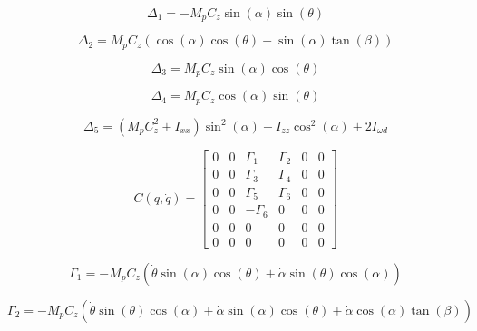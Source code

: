 \documentclass[11pt, twoside]{book}     %
\begin{document}
            \begin{equation}
                \Delta_1 = -M_p C_z\sin(\alpha)\sin(\theta)
            \end{equation}

            \begin{equation}
                \Delta_2 = M_p C_z(\cos(\alpha)\cos(\theta)-\sin(\alpha)\tan(\beta))
            \end{equation}

            \begin{equation}
                \Delta_3 = M_p C_z\sin(\alpha)\cos(\theta)
            \end{equation}

            \begin{equation}
                \Delta_4 = M_p C_z\cos(\alpha)\sin(\theta)
            \end{equation}

            \begin{equation}
                \Delta_5 = (M_pC_z^{2}+I_{xx})\sin^{2}(\alpha)+I_{zz}\cos^{2}(\alpha)+2I_{\omega d}
            \end{equation}

            \begin{equation}
            C(q, \dot{q}) =
            \begin{bmatrix}
                0 & 0 & \Gamma_1 & \Gamma_2 & 0 & 0 \\
                0 & 0 & \Gamma_3 & \Gamma_4 & 0 & 0 \\
                0 & 0 & \Gamma_5 & \Gamma_6 & 0 & 0 \\
                0 & 0 & -\Gamma_6 & 0 & 0 & 0 \\
                0 & 0 & 0 & 0 & 0 & 0 \\
                0 & 0 & 0 & 0 & 0 & 0
            \end{bmatrix}
            \end{equation}

            \begin{equation}
                \Gamma_1= -M_pC_z(\dot{\theta}\sin(\alpha)\cos(\theta)+\dot{\alpha}\sin(\theta)\cos(\alpha))
            \end{equation}

            \begin{equation}
                \Gamma_2= -M_pC_z(\dot{\theta}\sin(\theta)\cos(\alpha)+\dot{\alpha}\sin(\alpha)\cos(\theta)+\dot{\alpha}\cos(\alpha)\tan(\beta))
            \end{equation}
\end{document}
